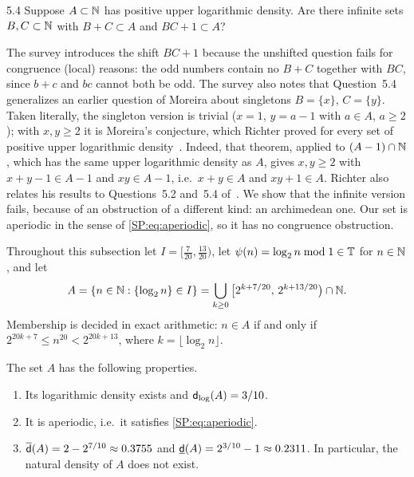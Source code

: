 \begin{question}{5.4}\label{SP:q:54}
Suppose $A\subset\mathbb{N}$ has positive upper logarithmic density. Are there infinite sets
$B,C\subset\mathbb{N}$ with $B+C\subset A$ and $BC+1\subset A$?
\end{question}

The survey introduces the shift $BC+1$ because the unshifted question fails for congruence
(local) reasons: the odd numbers contain no $B+C$ together with $BC$, since $b+c$ and $bc$ cannot
both be odd. The survey also notes that Question~5.4 generalizes an earlier question of Moreira
about singletons $B=\{x\}$, $C=\{y\}$. Taken literally, the singleton version is trivial ($x=1$,
$y=a-1$ with $a\in A$, $a\ge2$); with $x,y\ge2$ it is Moreira's conjecture, which Richter proved for every
set of positive upper logarithmic density~\cite[Theorem~1.5 with $Q(y)=y-1$]{richter2025sums}.
Indeed, that theorem, applied to $(A-1)\cap\mathbb{N}$, which has the same upper logarithmic density as $A$,
gives $x,y\ge2$ with $x+y-1\in A-1$ and $xy\in A-1$, i.e.\ $x+y\in A$ and $xy+1\in A$. Richter also relates his
results to Questions~5.2 and~5.4 of~\cite{kra2023problems}. We show that the infinite version
fails, because of an obstruction of a different kind: an archimedean one. Our set is aperiodic in
the sense of \eqref{SP:eq:aperiodic}, so it has no congruence obstruction.

Throughout this subsection let $I=[\tfrac{7}{20},\tfrac{13}{20})$, let
$\psi(n)=\log_2 n\bmod 1\in\mathbb{T}$ for $n\in\mathbb{N}$, and let
\[
A=\{n\in\mathbb{N}:\{\log_2n\}\in I\}=\bigcup_{k\ge0}\big[2^{k+7/20},\,2^{k+13/20}\big)\cap\mathbb{N} .
\]
Membership is decided in exact arithmetic: $n\in A$ if and only if
$2^{20k+7}\le n^{20}<2^{20k+13}$, where $k=\lfloor\log_2n\rfloor$.

\begin{proposition}\label{SP:prop:Aprops}
The set $A$ has the following properties.
\begin{enumerate}[label=\textup{(\roman*)}]
\item Its logarithmic density exists and $\mathsf{d}_{\log}(A)=3/10$.
\item It is aperiodic, i.e.\ it satisfies \eqref{SP:eq:aperiodic}.
\item $\overline{\mathsf{d}}(A)=2-2^{7/10}\approx0.3755$ and $\underline{\mathsf{d}}(A)=2^{3/10}-1\approx0.2311$. In particular,
the natural density of $A$ does not exist.
\end{enumerate}
\end{proposition}

